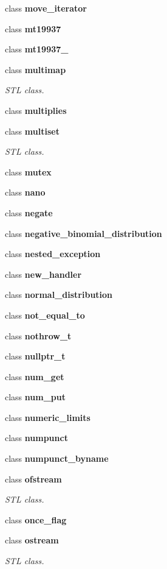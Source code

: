 \begin{DoxyCompactItemize}
\item 
class \textbf{ move\+\_\+iterator}
\item 
class \textbf{ mt19937}
\item 
class \textbf{ mt19937\+\_}
\item 
class \textbf{ multimap}
\begin{DoxyCompactList}\small\item\em S\+TL class. \end{DoxyCompactList}\item 
class \textbf{ multiplies}
\item 
class \textbf{ multiset}
\begin{DoxyCompactList}\small\item\em S\+TL class. \end{DoxyCompactList}\item 
class \textbf{ mutex}
\item 
class \textbf{ nano}
\item 
class \textbf{ negate}
\item 
class \textbf{ negative\+\_\+binomial\+\_\+distribution}
\item 
class \textbf{ nested\+\_\+exception}
\item 
class \textbf{ new\+\_\+handler}
\item 
class \textbf{ normal\+\_\+distribution}
\item 
class \textbf{ not\+\_\+equal\+\_\+to}
\item 
class \textbf{ nothrow\+\_\+t}
\item 
class \textbf{ nullptr\+\_\+t}
\item 
class \textbf{ num\+\_\+get}
\item 
class \textbf{ num\+\_\+put}
\item 
class \textbf{ numeric\+\_\+limits}
\item 
class \textbf{ numpunct}
\item 
class \textbf{ numpunct\+\_\+byname}
\item 
class \textbf{ ofstream}
\begin{DoxyCompactList}\small\item\em S\+TL class. \end{DoxyCompactList}\item 
class \textbf{ once\+\_\+flag}
\item 
class \textbf{ ostream}
\begin{DoxyCompactList}\small\item\em S\+TL class. \end{DoxyCompactList}\item 

\end{DoxyCompactItemize}
